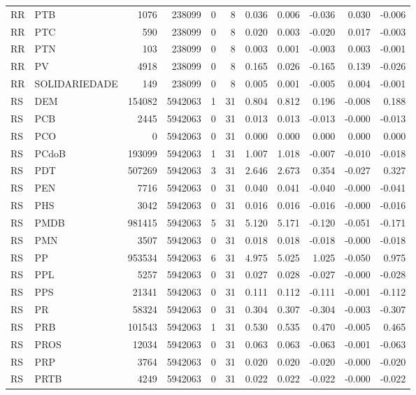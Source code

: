 \begin{landscape}
\begin{longtable}{llrrrrrrrrr}
RR & PTB & 1076 & 238099 & 0 & 8 & 0.036 & 0.006 & -0.036 & 0.030 & -0.006 \\
RR & PTC & 590 & 238099 & 0 & 8 & 0.020 & 0.003 & -0.020 & 0.017 & -0.003 \\
RR & PTN & 103 & 238099 & 0 & 8 & 0.003 & 0.001 & -0.003 & 0.003 & -0.001 \\
RR & PV & 4918 & 238099 & 0 & 8 & 0.165 & 0.026 & -0.165 & 0.139 & -0.026 \\
RR & SOLIDARIEDADE & 149 & 238099 & 0 & 8 & 0.005 & 0.001 & -0.005 & 0.004 & -0.001 \\
RS & DEM & 154082 & 5942063 & 1 & 31 & 0.804 & 0.812 & 0.196 & -0.008 & 0.188 \\
RS & PCB & 2445 & 5942063 & 0 & 31 & 0.013 & 0.013 & -0.013 & -0.000 & -0.013 \\
RS & PCO & 0 & 5942063 & 0 & 31 & 0.000 & 0.000 & 0.000 & 0.000 & 0.000 \\
RS & PCdoB & 193099 & 5942063 & 1 & 31 & 1.007 & 1.018 & -0.007 & -0.010 & -0.018 \\
RS & PDT & 507269 & 5942063 & 3 & 31 & 2.646 & 2.673 & 0.354 & -0.027 & 0.327 \\
RS & PEN & 7716 & 5942063 & 0 & 31 & 0.040 & 0.041 & -0.040 & -0.000 & -0.041 \\
RS & PHS & 3042 & 5942063 & 0 & 31 & 0.016 & 0.016 & -0.016 & -0.000 & -0.016 \\
RS & PMDB & 981415 & 5942063 & 5 & 31 & 5.120 & 5.171 & -0.120 & -0.051 & -0.171 \\
RS & PMN & 3507 & 5942063 & 0 & 31 & 0.018 & 0.018 & -0.018 & -0.000 & -0.018 \\
RS & PP & 953534 & 5942063 & 6 & 31 & 4.975 & 5.025 & 1.025 & -0.050 & 0.975 \\
RS & PPL & 5257 & 5942063 & 0 & 31 & 0.027 & 0.028 & -0.027 & -0.000 & -0.028 \\
RS & PPS & 21341 & 5942063 & 0 & 31 & 0.111 & 0.112 & -0.111 & -0.001 & -0.112 \\
RS & PR & 58324 & 5942063 & 0 & 31 & 0.304 & 0.307 & -0.304 & -0.003 & -0.307 \\
RS & PRB & 101543 & 5942063 & 1 & 31 & 0.530 & 0.535 & 0.470 & -0.005 & 0.465 \\
RS & PROS & 12034 & 5942063 & 0 & 31 & 0.063 & 0.063 & -0.063 & -0.001 & -0.063 \\
RS & PRP & 3764 & 5942063 & 0 & 31 & 0.020 & 0.020 & -0.020 & -0.000 & -0.020 \\
RS & PRTB & 4249 & 5942063 & 0 & 31 & 0.022 & 0.022 & -0.022 & -0.000 & -0.022 \\

\end{longtable}
\end{landscape}
